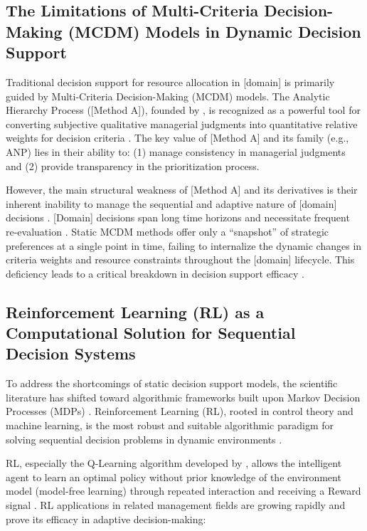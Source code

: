 \documentclass[10pt,twocolumn]{article}
\begin{document}
\subsection{The Limitations of Multi-Criteria Decision-Making
(MCDM) Models in Dynamic Decision Support}

Traditional decision support for resource allocation in [domain]
is primarily guided by Multi-Criteria Decision-Making (MCDM)
models. The Analytic Hierarchy Process ([Method A]), founded by
\citet{Saaty1990}, is recognized as a powerful tool for converting
subjective qualitative managerial judgments into quantitative
relative weights for decision criteria \citep{Author1990}. The key
value of [Method A] and its family (e.g., ANP) lies in their
ability to: (1) manage consistency in managerial judgments and (2)
provide transparency in the prioritization process.

However, the main structural weakness of [Method A] and its
derivatives is their inherent inability to manage the sequential
and adaptive nature of [domain] decisions \citep{Author2012b}.
[Domain] decisions span long time horizons and necessitate frequent
re-evaluation \citep{Author2007b}. Static MCDM methods offer only
a ``snapshot'' of strategic preferences at a single point in time,
failing to internalize the dynamic changes in criteria weights and
resource constraints throughout the [domain] lifecycle. This
deficiency leads to a critical breakdown in decision support
efficacy \citep{Author2023c, Author2021d}.

\subsection{Reinforcement Learning (RL) as a Computational
Solution for Sequential Decision Systems}

To address the shortcomings of static decision support models, the
scientific literature has shifted toward algorithmic frameworks
built upon Markov Decision Processes (MDPs)
\citep{Author2021e}. Reinforcement Learning (RL), rooted in
control theory and machine learning, is the most robust and
suitable algorithmic paradigm for solving sequential decision
problems in dynamic environments \citep{Sutton1998,Author2007c}.

RL, especially the Q-Learning algorithm developed by
\citet{Watkins1992}, allows the intelligent agent to learn an
optimal policy without prior knowledge of the environment model
(model-free learning) through repeated interaction and receiving a
Reward signal \citep{Author2017c}. RL applications in related
management fields are growing rapidly and prove its efficacy in
adaptive decision-making:
\end{document}
